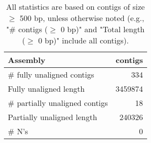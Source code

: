 \documentclass[12pt,a4paper]{article}
\begin{document}
\begin{table}[ht]
\begin{center}
\caption{All statistics are based on contigs of size $\geq$ 500 bp, unless otherwise noted (e.g., "\# contigs ($\geq$ 0 bp)" and "Total length ($\geq$ 0 bp)" include all contigs).}
\begin{tabular}{|l*{1}{|r}|}
\hline
Assembly & contigs \\ \hline
\# fully unaligned contigs & 334 \\ \hline
Fully unaligned length & 3459874 \\ \hline
\# partially unaligned contigs & 18 \\ \hline
Partially unaligned length & 240326 \\ \hline
\# N's & 0 \\ \hline
\end{tabular}
\end{center}
\end{table}
\end{document}
